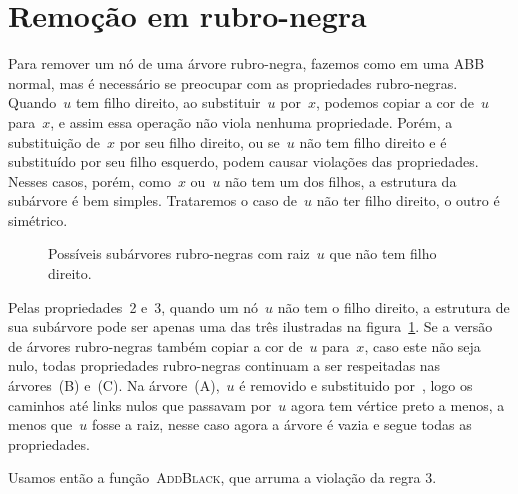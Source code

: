 \documentclass[../../main.tex]{subfiles}
\begin{document}
\section{Remoção em rubro-negra}

Para remover um nó de uma árvore rubro-negra, fazemos como em uma ABB normal, mas é necessário se preocupar com as propriedades rubro-negras. Quando~$u$ tem filho direito, ao substituir~$u$ por~$x$, podemos copiar a cor de~$u$ para~$x$, e assim essa operação não viola nenhuma propriedade. Porém, a substituição de~$x$ por seu filho direito, ou se~$u$ não tem filho direito e é substituído por seu filho esquerdo, podem causar violações das propriedades. Nesses casos, porém, como~$x$ ou~$u$ não tem um dos filhos, a estrutura da subárvore é bem simples. Trataremos o caso de~$u$ não ter filho direito, o outro é simétrico.

\begin{figure}
\centering
{}
\caption{Possíveis subárvores rubro-negras com raiz~$u$ que não tem filho direito.} \label{fig:rbnorchild}
\end{figure}

Pelas propriedades~2 e~3, quando um nó~$u$ não tem o filho direito, a estrutura de sua subárvore pode ser apenas uma das três ilustradas na figura~\ref{fig:rbnorchild}.
Se a versão~ de árvores rubro-negras também copiar a cor de~$u$ para~$x$, caso este não seja nulo, todas propriedades rubro-negras continuam a ser respeitadas nas árvores~(B) e~(C). Na árvore~(A),~$u$ é removido e substituido por~, logo os caminhos até links nulos que passavam por~$u$ agora tem vértice preto a menos, a menos que~$u$ fosse a raiz, nesse caso agora a árvore é vazia e segue todas as propriedades.

Usamos então a função~\textsc{AddBlack}, que arruma a violação da regra 3.
\end{document}

